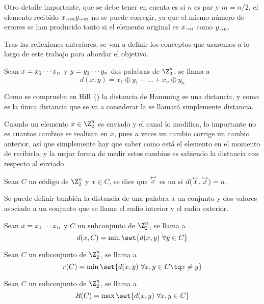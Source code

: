 Otro detalle importante, que se debe tener en cuenta es si $n$ es par y $m=n/2$, el elemento recibido $x_{\shortrightarrow m}y_{\shortrightarrow m}$ no se puede corregir, ya que el mismo número de errores se han producido tanto si el elemento original es $x_{\shortrightarrow n}$ como $y_{\shortrightarrow n}$.

Tras las reflexiones anteriores, se van a definir los conceptos que usaremos a lo largo de este trabajo para abordar el objetivo.

\begin{definition}
	Sean $x=x_1\cdots x_{n}$ y $y=y_1\cdots y_{n}$ dos palabras de $\Z_2^n$, se llama  a
	\[
		d(x, y) = x_1\oplus y_1 + \dots + x_n\oplus y_n
	\]
\end{definition}

Como se comprueba en Hill~(\citeyear[5]{hill_first_1980}) la distancia de Hamming es una distancia, y como es la única distancia que se va a considerar la se llamará simplemente distancia.

Cuando un elemento $x\in\Z_2^n$ es enviado y el canal lo modifica, lo importante no es cuantos cambios se realizan en $x$, pues a veces un cambio corrige un cambio anterior, así que simplemente hay que saber como está el elemento en el momento de recibirlo, y la mejor forma de medir estos cambios es sabiendo la distancia con respecto al enviado.

\begin{definition}
	Sean $C$ un código de $\Z_2^n$ y $x\in C$, se dice que $\stackrel{\hookleftarrow}{x}$ es un  si $d(\stackrel{\hookleftarrow}{x}, \stackrel{\hookrightarrow}{x})= n$.
\end{definition}

Se puede definir también la distancia de una palabra a un conjunto y dos valores asociado a un conjunto que se llama el radio interior y el radio exterior.

\begin{definition}
	Sean $x=x_1\cdots x_{n}$ y $C$ un subconjunto de $\Z_2^n$, se llama  a
	\[
		d(x, C) = \min\set{d(x,y)\ \forall y\in C}
	\]
\end{definition}

\begin{definition}
	Sean $C$ un subconjunto de $\Z_2^n$, se llama  a
	\[
		r(C) = \min\set{d(x,y)\ \forall x,y\in C\tq x\neq y}
	\]
\end{definition}

\begin{definition}
	Sean $C$ un subconjunto de $\Z_2^n$, se llama  a
	\[
		R(C) = \max\set{d(x,y)\ \forall x,y\in C}
	\]
\end{definition}

